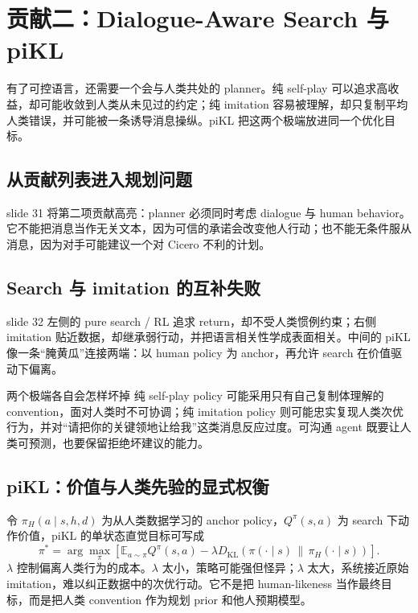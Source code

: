 \section{贡献二：Dialogue-Aware Search 与 piKL}

有了可控语言，还需要一个会与人类共处的 planner。纯 self-play 可以追求高收益，却可能收敛到人类从未见过的约定；纯 imitation 容易被理解，却只复制平均人类错误，并可能被一条诱导消息操纵。piKL 把这两个极端放进同一个优化目标。

\subsection{从贡献列表进入规划问题}

slide 31 将第二项贡献高亮：planner 必须同时考虑 dialogue 与 human behavior。它不能把消息当作无关文本，因为可信的承诺会改变他人行动；也不能无条件服从消息，因为对手可能建议一个对 Cicero 不利的计划。


\subsection{Search 与 imitation 的互补失败}

slide 32 左侧的 pure search / RL 追求 return，却不受人类惯例约束；右侧 imitation 贴近数据，却继承弱行动，并把语言相关性学成表面相关。中间的 piKL 像一条“腌黄瓜”连接两端：以 human policy 为 anchor，再允许 search 在价值驱动下偏离。


\begin{warningbox}{两个极端各自会怎样坏掉}
纯 self-play policy 可能采用只有自己复制体理解的 convention，面对人类时不可协调；纯 imitation policy 则可能忠实复现人类次优行为，并对“请把你的关键领地让给我”这类消息反应过度。可沟通 agent 既要让人类可预测，也要保留拒绝坏建议的能力。
\end{warningbox}

\subsection{piKL：价值与人类先验的显式权衡}

令 $\pi_H(a\mid s,h,d)$ 为从人类数据学习的 anchor policy，$Q^{\pi}(s,a)$ 为 search 下动作价值，piKL 的单状态直觉目标可写成
\begin{equation}
\pi^*
=\arg\max_{\pi}
\left[
\mathbb{E}_{a\sim\pi}Q^{\pi}(s,a)
-\lambda D_{\mathrm{KL}}\!\left(\pi(\cdot\mid s)\,\|\,\pi_H(\cdot\mid s)\right)
\right].
\end{equation}
$\lambda$ 控制偏离人类行为的成本。$\lambda$ 太小，策略可能强但怪异；$\lambda$ 太大，系统接近原始 imitation，难以纠正数据中的次优行动。它不是把 human-likeness 当作最终目标，而是把人类 convention 作为规划 prior 和他人预期模型。

